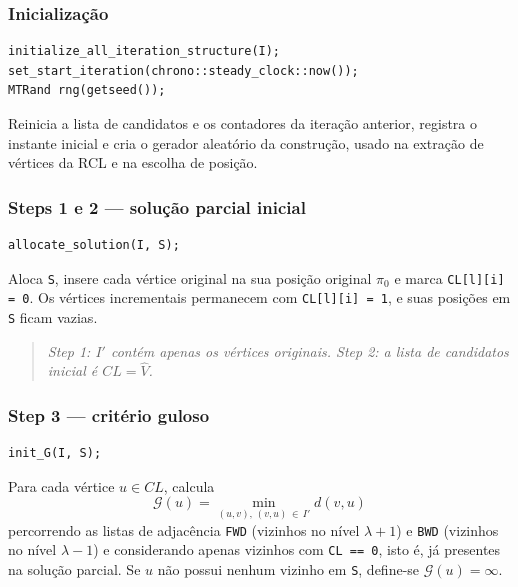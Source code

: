 \documentclass[12pt,a4paper]{article}
\newenvironment{artigo}
  {\begin{quote}\small\itshape}
  {\end{quote}}
\begin{document}
\subsubsection{Inicialização}

\begin{lstlisting}
initialize_all_iteration_structure(I);
set_start_iteration(chrono::steady_clock::now());
MTRand rng(getseed());
\end{lstlisting}

Reinicia a lista de candidatos e os contadores da iteração anterior,
registra o instante inicial e cria o gerador aleatório da construção,
usado na extração de vértices da RCL e na escolha de posição.

\subsubsection{Steps 1 e 2 --- solução parcial inicial}

\begin{lstlisting}
allocate_solution(I, S);
\end{lstlisting}

Aloca \texttt{S}, insere cada vértice original na sua posição original
$\pi_0$ e marca \texttt{CL[l][i] = 0}. Os vértices incrementais
permanecem com \texttt{CL[l][i] = 1}, e suas posições em \texttt{S} ficam
vazias.

\begin{artigo}
Step 1: $I'$ contém apenas os vértices originais.
Step 2: a lista de candidatos inicial é $CL = \hat{V}$.
\end{artigo}

\subsubsection{Step 3 --- critério guloso}

\begin{lstlisting}
init_G(I, S);
\end{lstlisting}

Para cada vértice $u \in CL$, calcula
\begin{equation}
\mathcal{G}(u) = \min_{(u,v),\,(v,u)\,\in\,I'} d(v,u)
\label{eq:G}
\end{equation}
percorrendo as listas de adjacência \texttt{FWD} (vizinhos no nível
$\lambda+1$) e \texttt{BWD} (vizinhos no nível $\lambda-1$) e considerando
apenas vizinhos com \texttt{CL == 0}, isto é, já presentes na solução
parcial. Se $u$ não possui nenhum vizinho em \texttt{S}, define-se
$\mathcal{G}(u) = \infty$.
\end{document}
